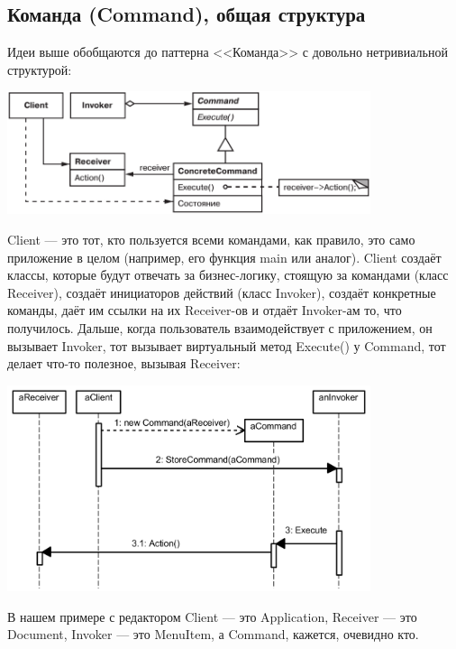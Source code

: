 \documentclass{../text-style}
\begin{document}
\subsection{Команда (Command), общая структура}

Идеи выше обобщаются до паттерна <<Команда>> с довольно нетривиальной структурой:

\begin{center}
    \includegraphics[width=0.8\textwidth]{command.png}
\end{center}

Client --- это тот, кто пользуется всеми командами, как правило, это само приложение в целом (например, его функция main или аналог). Client создаёт классы, которые будут отвечать за бизнес-логику, стоящую за командами (класс Receiver), создаёт инициаторов действий (класс Invoker), создаёт конкретные команды, даёт им ссылки на их Receiver-ов и отдаёт Invoker-ам то, что получилось. Дальше, когда пользователь взаимодействует с приложением, он вызывает Invoker, тот вызывает виртуальный метод Execute() у Command, тот делает что-то полезное, вызывая Receiver:

\begin{center}
    \includegraphics[width=0.8\textwidth]{commandSequence.png}
\end{center}

В нашем примере с редактором Client --- это Application, Receiver --- это Document, Invoker --- это MenuItem, а Command, кажется, очевидно кто.
\end{document}
